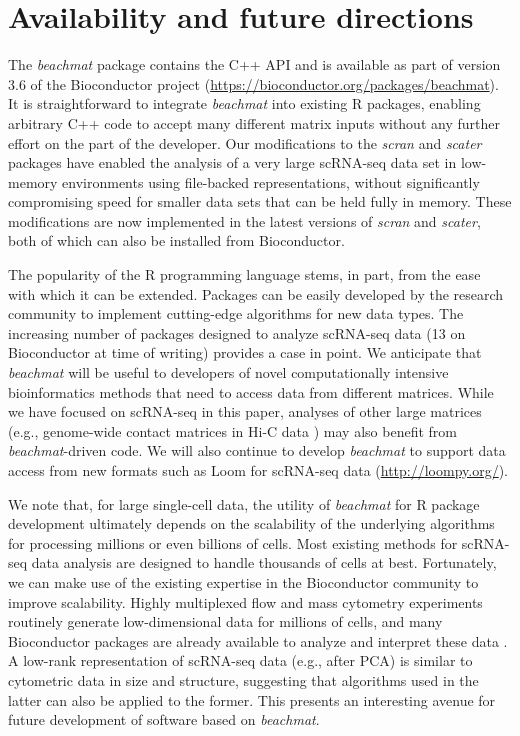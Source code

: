 \documentclass[10pt,letterpaper]{article}
\newcommand{\beachmat}{\textit{beachmat}}
\begin{document}
\section*{Availability and future directions}
The \beachmat{} package contains the C++ API and is available as part of version 3.6 of the Bioconductor project (\url{https://bioconductor.org/packages/beachmat}).
It is straightforward to integrate \beachmat{} into existing R packages, enabling arbitrary C++ code to accept many different matrix inputs without any further effort on the part of the developer.
Our modifications to the \textit{scran} and \textit{scater} packages have enabled the analysis of a very large scRNA-seq data set in low-memory environments using file-backed representations, without significantly compromising speed for smaller data sets that can be held fully in memory.
These modifications are now implemented in the latest versions of \textit{scran} and \textit{scater}, both of which can also be installed from Bioconductor.

The popularity of the R programming language stems, in part, from the ease with which it can be extended.
Packages can be easily developed by the research community to implement cutting-edge algorithms for new data types.
The increasing number of packages designed to analyze scRNA-seq data (13 on Bioconductor at time of writing) provides a case in point.
We anticipate that \beachmat{} will be useful to developers of novel computationally intensive bioinformatics methods that need to access data from different matrices.
While we have focused on scRNA-seq in this paper, analyses of other large matrices (e.g., genome-wide contact matrices in Hi-C data \cite{lun2016infrastructure}) may also benefit from \beachmat{}-driven code.
We will also continue to develop \beachmat{} to support data access from new formats such as Loom for scRNA-seq data (\url{http://loompy.org/}).

We note that, for large single-cell data, the utility of \beachmat{} for R package development ultimately depends on the scalability of the underlying algorithms for processing millions or even billions of cells.
Most existing methods for scRNA-seq data analysis are designed to handle thousands of cells at best.
Fortunately, we can make use of the existing expertise in the Bioconductor community to improve scalability.
Highly multiplexed flow and mass cytometry experiments routinely generate low-dimensional data for millions of cells,
and many Bioconductor packages are already available to analyze and interpret these data \cite{finak2014opencyto,weber2016comparison,lun2017testing}.
A low-rank representation of scRNA-seq data (e.g., after PCA) is similar to cytometric data in size and structure, suggesting that algorithms used in the latter can also be applied to the former.
This presents an interesting avenue for future development of software based on \beachmat{}.
\end{document}
